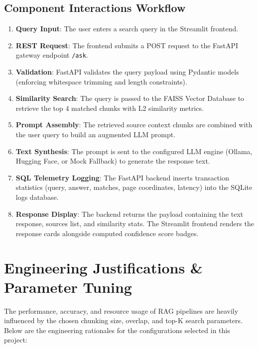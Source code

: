\documentclass[11pt,a4paper]{article}
\begin{document}
\subsection{Component Interactions Workflow}
\begin{enumerate}
    \item \textbf{Query Input}: The user enters a search query in the Streamlit frontend.
    \item \textbf{REST Request}: The frontend submits a POST request to the FastAPI gateway endpoint \texttt{/ask}.
    \item \textbf{Validation}: FastAPI validates the query payload using Pydantic models (enforcing whitespace trimming and length constraints).
    \item \textbf{Similarity Search}: The query is passed to the FAISS Vector Database to retrieve the top 4 matched chunks with L2 similarity metrics.
    \item \textbf{Prompt Assembly}: The retrieved source context chunks are combined with the user query to build an augmented LLM prompt.
    \item \textbf{Text Synthesis}: The prompt is sent to the configured LLM engine (Ollama, Hugging Face, or Mock Fallback) to generate the response text.
    \item \textbf{SQL Telemetry Logging}: The FastAPI backend inserts transaction statistics (query, answer, matches, page coordinates, latency) into the SQLite logs database.
    \item \textbf{Response Display}: The backend returns the payload containing the text response, sources list, and similarity stats. The Streamlit frontend renders the response cards alongside computed confidence score badges.
\end{enumerate}


\section{Engineering Justifications \& Parameter Tuning}
The performance, accuracy, and resource usage of RAG pipelines are heavily influenced by the chosen chunking size, overlap, and top-K search parameters. Below are the engineering rationales for the configurations selected in this project:
\end{document}
